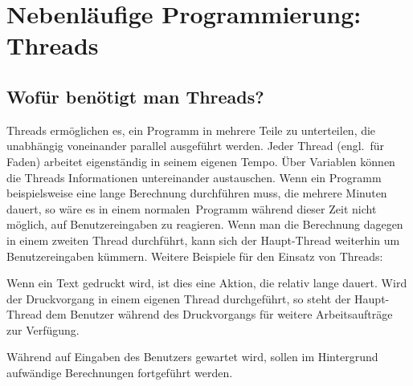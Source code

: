\chapter{Nebenläufige Programmierung: Threads \tagLK}
\renewcommand{\chaptertitle}{Nebenläufige Programmierung: Threads}

\lehead[]{\normalfont\sffamily\hspace*{-2.00cm}\textcolor{white}{\colorbox{lightblue}{\makebox[1.60cm][r]{\thechapter}}}\hspace{0.17cm}\textcolor{lightblue}{\chaptertitle}}
\rohead[]{\textcolor{lightblue}{\chaptertitle}\normalfont\sffamily\hspace*{0.17cm}\textcolor{white}{\colorbox{lightblue}{\makebox[1.60cm][l]{\thechapter}}}\hspace{-2.00cm}}
\rehead[]{\textcolor{lightblue}{AvHG, Inf, My}}
\lohead[]{\textcolor{lightblue}{AvHG, Inf, My}}

\lstset{style=myJava}

\section{Wofür benötigt man Threads?}

Threads ermöglichen es, ein Programm in mehrere Teile zu unterteilen, die
unabhängig voneinander parallel ausgeführt werden. Jeder Thread (engl.\ für
Faden) arbeitet eigenständig in seinem eigenen Tempo. Über Variablen können die
Threads Informationen untereinander austauschen. Wenn ein Programm
beispielsweise eine lange Berechnung durchführen muss, die mehrere Minuten
dauert, so wäre es in einem \glqq normalen\grqq\ Programm während dieser Zeit
nicht möglich, auf Benutzereingaben zu reagieren. Wenn man die Berechnung dagegen
in einem zweiten Thread durchführt, kann sich der Haupt-Thread weiterhin um
Benutzereingaben kümmern. Weitere Beispiele für den Einsatz von Threads:

\begin{compactitem}
\item Wenn ein Text gedruckt wird, ist dies eine Aktion, die relativ lange
dauert. Wird der Druckvorgang in einem eigenen Thread durchgeführt, so steht der
Haupt-Thread dem Benutzer während des Druckvorgangs für weitere Arbeitsaufträge
zur Verfügung.

\item Während auf Eingaben des Benutzers gewartet wird, sollen im Hintergrund
aufwändige Berechnungen fortgeführt werden.
\end{compactitem}


